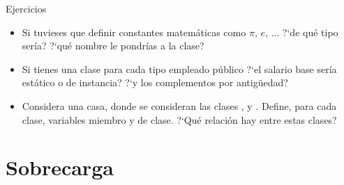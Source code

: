 \documentclass[10pt,envcountsect,spanish]{beamer}
\begin{document}
\begin{frame}{Ejercicios}

\begin{ejercicio}{}
\begin{itemize}[leftmargin=\dimexpr .5cm]
\item Si tuvieses que definir constantes matemáticas como $\pi$, $e$, ... ?`de qué tipo sería? ?`qué nombre le pondrías a la clase?  %

\item Si tienes una clase para cada tipo empleado público ?`el salario base sería estático o de instancia? ?`y los complementos por antigüedad? %

\item Considera una casa, donde se consideran las clases ,  y .
Define, para cada clase, variables miembro y de clase. ?`Qué relación hay entre estas clases?
\end{itemize}

\end{ejercicio}

\end{frame}





\section{Sobrecarga}
\end{document}
